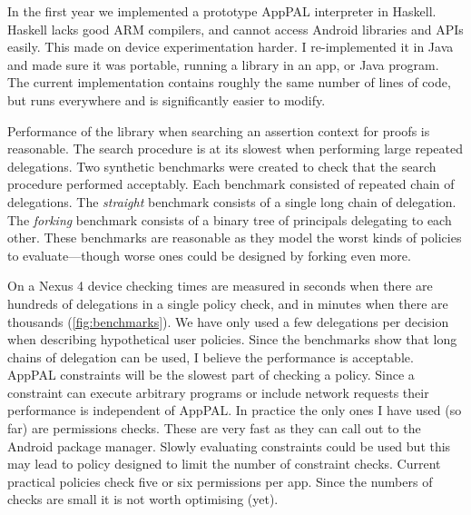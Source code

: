 \documentclass[a4paper]{scrartcl}
\begin{document}
In the first year we implemented a prototype AppPAL interpreter in Haskell.
Haskell lacks good ARM compilers, and cannot access Android libraries and APIs easily.
This made on device experimentation harder.
I re-implemented it in Java and made sure it was portable, running a library in an app, or Java program.
The current implementation contains roughly the same number of lines of code, but runs everywhere and is significantly easier to modify.

Performance of the library when searching an assertion context for proofs is reasonable.
The search procedure is at its slowest when performing large repeated delegations.
Two synthetic benchmarks were created to check that the search procedure performed acceptably.
Each benchmark consisted of repeated chain of delegations.
The \emph{straight} benchmark consists of a single long chain of delegation.
The \emph{forking} benchmark consists of a binary tree of principals delegating to each other.
These benchmarks are reasonable as they model the worst kinds of policies to evaluate---though worse ones could be designed by forking even more.

On a Nexus 4 device checking times are measured in seconds when there are hundreds of delegations in a single policy check, and in minutes when there are thousands (\autoref{fig:benchmarks}).
We have only used a few delegations per decision when describing hypothetical user policies.
Since the benchmarks show that long chains of delegation can be used, I believe the performance is acceptable.
AppPAL constraints will be the slowest part of checking a policy.
Since a constraint can execute arbitrary programs or include network requests their performance is independent of AppPAL.
In practice the only ones I have used (so far) are permissions checks.
These are very fast as they can call out to the Android package manager.
Slowly evaluating constraints could be used but this may lead to policy designed to limit the number of constraint checks.
Current practical policies check five or six permissions per app.
Since the numbers of checks are small it is not worth optimising (yet).
\end{document}
